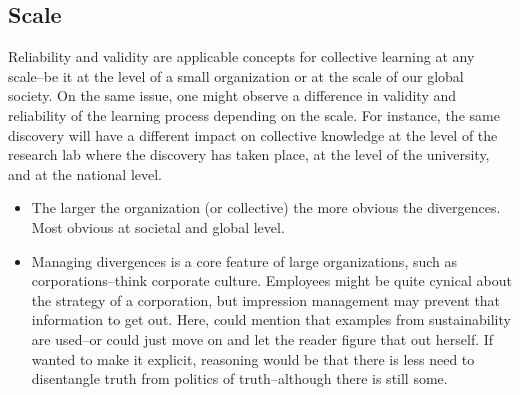 
\subsection*{Scale}


Reliability and validity are applicable concepts for collective learning at any scale--be it at the level of a small organization or at the scale of our global society. On the same issue, one might observe a difference in validity and reliability of the learning process depending on the scale. For instance, the same discovery will have a different impact on collective knowledge at the level of the research lab where the discovery has taken place, at the level of the university, and at the national level.

\begin{itemize}
	\item The larger the organization (or collective) the more obvious the divergences. Most obvious at societal and global level.
	\item Managing divergences is a core feature of large organizations, such as corporations--think corporate culture. Employees might be quite cynical about the strategy of a corporation, but impression management may prevent that information to get out.
		\subitem Here, could mention that examples from sustainability are used--or could just move on and let the reader figure that out herself. 
		\subitem If wanted to make it explicit, reasoning would be that there is less need to disentangle truth from politics of truth--although there is still some.
\end{itemize}
